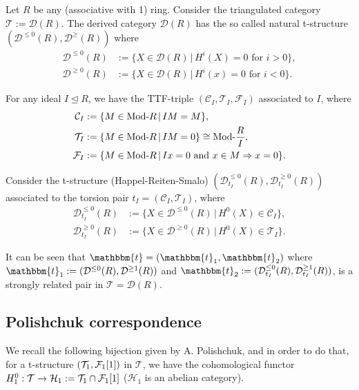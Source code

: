 \begin{example}
  Let $R$ be any (associative with 1) ring. Consider the triangulated category $\mathcal{T}:=\mathcal{D}(R)$.
  The derived category $\mathcal{D}(R)$ has the so called natural t-structure
  $(\mathcal{D}^{\leq 0}(R),\mathcal{D}^{\geq}(R))$ where
  \begin{align*}
    \mathcal{D}^{\leq 0}(R) &:= \{ X\in\mathcal{D}(R) \,|\,H^i(X)=0\text{ for } i>0\},\\
    \mathcal{D}^{\geq 0}(R) &:= \{ X\in\mathcal{D}(R) \,|\,H^i(x)=0\text{ for } i<0\}.
  \end{align*}

  For any ideal $I\trianglelefteq R$, we have the TTF-triple $(\mathcal{C}_I,\mathcal{T}_I,\mathcal{F}_I)$
  associated to $I$, where
  \begin{align*}
    \mathcal{C}_I &:= \{M\in\mathrm{\textup{Mod-}}R\,|\,IM=M\},\\
    \mathcal{T}_I &:= \{M\in\mathrm{\textup{Mod-}}R\,|\,IM=0\}\cong \mathrm{\textup{Mod-}}\frac{R}{I},\\
    \mathcal{F}_I &:= \{M\in\mathrm{\textup{Mod-}}R\,|\,Ix=0\text{ and }x\in M\Rightarrow x=0\}.
  \end{align*}

  Consider the t-structure (Happel-Reiten-Smalo) $(\mathcal{D}^{\leq 0}_{t_I}(R), \mathcal{D}^{\geq 0}_{t_I}(R))$
  associated to the torsion pair $t_I=(\mathcal{C}_I,\mathcal{T}_I)$, where
  \begin{align*}
    \mathcal{D}^{\leq 0}_{t_I}(R) &:= \{ X\in\mathcal{D}^{\leq 0}(R)\,|\, H^0(X)\in\mathcal{C}_I \},\\
    \mathcal{D}^{\geq 0}_{t_I}(R) &:= \{ X\in\mathcal{D}^{\geq 0}(R)\,|\, H^0(X)\in\mathcal{T}_I \}.
  \end{align*}

  It can be seen that $\mathbbm{t}=(\mathbbm{t}_1,\mathbbm{t}_2)$ where
  $\mathbbm{t}_1:=(\mathcal{D}^{\leq 0}(R),\mathcal{D}^{\geq 1}(R))$ and
  $\mathbbm{t}_2:=(\mathcal{D}^{\leq 0}_{t_I}(R),\mathcal{D}^{\geq 1}_{t_I}(R))$, is a strongly
  related pair in $\mathcal{T}=\mathcal{D}(R)$.
\end{example}

\subsection{Polishchuk correspondence}

We recall the following bijection given by A. Polishchuk, and in order to do that,
for a t-structure $(\mathcal{T}_1,\mathcal{F}_1[1])$ in $\mathcal{T}$, we have the cohomological
functor $H^0_1:\mathcal{T}\to \mathcal{H}_1:=\mathcal{T}_1\cap\mathcal{F}_1[1]$
($\mathcal{H}_1$ is an abelian category).

